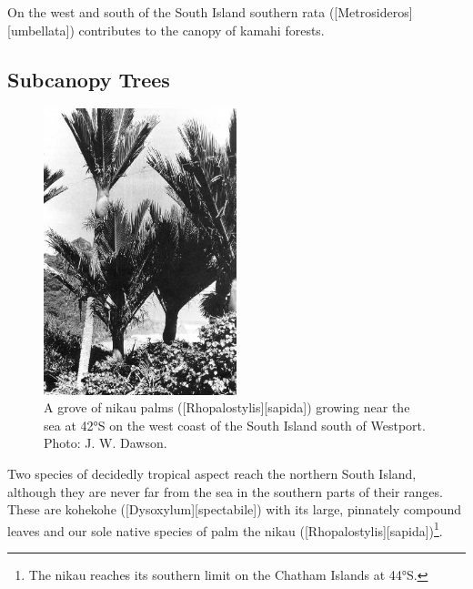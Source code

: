 On the west and south of the South Island southern rata ([Metrosideros][umbellata]) contributes to the canopy of kamahi forests.

\subsection{Subcanopy Trees}

\begin{figure}
	\includegraphics[width=0.5\textwidth]{graphics/figure60nikau.jpg}
	\centering
	\caption[A grove of nikau palms]{A grove of nikau palms ([Rhopalostylis][sapida]) growing near the sea at 42°S on the west coast of the South Island south of Westport. Photo:  J. W. Dawson.}%
	\label{fig:60nikau}
\end{figure}

Two species of decidedly tropical aspect reach the northern South Island, although they are never far from the sea in the southern parts of their ranges.
These are kohekohe ([Dysoxylum][spectabile]) with its large, pinnately compound leaves and our sole native species of palm the nikau ([Rhopalostylis][sapida])\footnote{The nikau reaches its southern limit on the Chatham Islands at 44°S.}.

